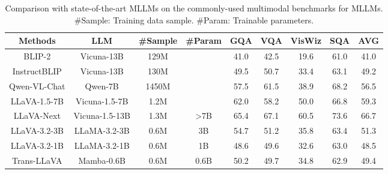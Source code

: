 
\begin{table*}[]
\centering
\scalebox{1.0}
{
\begin{tabular}{c|c|cc|cccc|c}
\midrule
Methods      & LLM                               & \#Sample & \#Param                            & GQA  & VQA  & VisWiz & SQA  & AVG \\ \midrule
BLIP-2       & Vicuna-13B                        & 129M     &                                    & 41.0 & 42.5 & 19.6   & 61.0 &   41.0  \\
InstructBLIP & Vicuna-13B                        & 130M     &                                    & 49.5 & 50.7 & 33.4   & 63.1 &  49.2   \\
Qwen-VL-Chat & Qwen-7B                           & 1450M    &                                    & 57.5 & 61.5 & 38.9   & 68.2 &  56.5   \\
LLaVA-1.5-7B & Vicuna-1.5-7B                     & 1.2M     &                                    & 62.0 & 58.2 & 50.0   & 66.8 &  59.3   \\
LLaVA-Next   & Vicuna-1.5-13B                    & 1.3M     & \multirow{-5}{*}{\textgreater{}7B} & 65.4 & 67.1 & 60.5   & 73.6 & 66.7    \\ \midrule
LLaVA-3.2-3B & LLaMA-3.2-3B                      & 0.6M     & 3B                                 & 54.7 & 51.2     &   35.8     &    63.4  &  51.3   \\
LLaVA-3.2-1B & LLaMA-3.2-1B                      & 0.6M     & 1B                                 & 48.6 &  49.6    &  32.6      &  63.0    & 48.5    \\
Trans-LLaVA  & Mamba-0.6B & 0.6M     & 0.6B                               &  50.2    &  49.7    &  34.8      & 62.9     & 49.4    \\ \midrule
\end{tabular}}
\caption{
Comparison with state-of-the-art MLLMs on the commonly-used multimodal benchmarks for MLLMs.
\#Sample: Training data sample. 
\#Param: Trainable parameters. 
}
\label{tab:resulits_llava}
\end{table*}